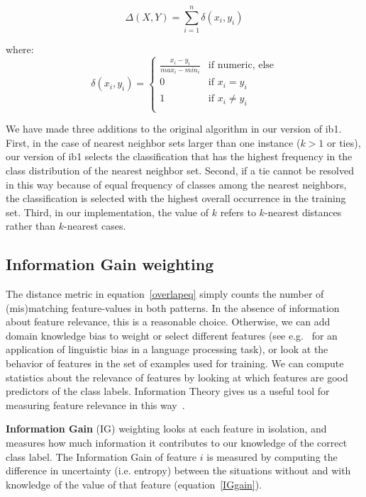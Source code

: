 \documentclass{report}
\begin{document}
\begin{equation}
\Delta(X,Y) = \sum_{i=1}^{n} \delta(x_{i},y_{i})
\label{distance}
\end{equation}

where:
\begin{equation}
\delta(x_{i}, y_{i}) = \left\{ \begin{array}{ll}
		\frac{x_{i}-y_{i}}{max_{i}-min_{i}} & \mbox{if numeric, else}\\
		0 & \mbox{if $x_{i} = y_{i}$}\\
		1 & \mbox{if $x_{i} \neq y_{i}$}\\
	\end{array} \right.
\label{overlapeq}
\end{equation}

We have made three additions to the original algorithm \cite{Aha+91} in
our version of {\sc ib1}.  First, in the case of nearest neighbor sets
larger than one instance ($k>1$ or ties), our version of {\sc ib1}
selects the classification that has the highest frequency in the class
distribution of the nearest neighbor set. Second, if a tie cannot be
resolved in this way because of equal frequency of classes among the
nearest neighbors, the classification is selected with the highest
overall occurrence in the training set. Third, in our implementation,
the value of $k$ refers to $k$-nearest distances rather than
$k$-nearest cases.

\subsection{Information Gain weighting}
\label{infogain}

The distance metric in equation~\ref{overlapeq} simply counts the
number of (mis)matching feature-values in both patterns. In the
absence of information about feature relevance, this is a reasonable
choice. Otherwise, we can add domain knowledge bias to weight or
select different features (see e.g.~\cite{Cardie96} for an
application of linguistic bias in a language processing task), or look
at the behavior of features in the set of examples used for
training. We can compute statistics about the relevance of features by
looking at which features are good predictors of the class
labels. Information Theory gives us a useful tool for measuring
feature relevance in this way~\cite{Quinlan86,Quinlan93}.

{\bf Information Gain} (IG) weighting looks at each feature in
isolation, and measures how much information it contributes to our
knowledge of the correct class label. The Information Gain of feature
$i$ is measured by computing the difference in uncertainty
(i.e. entropy) between the situations without and with knowledge of
the value of that feature (equation~\ref{IGgain}).
\end{document}
